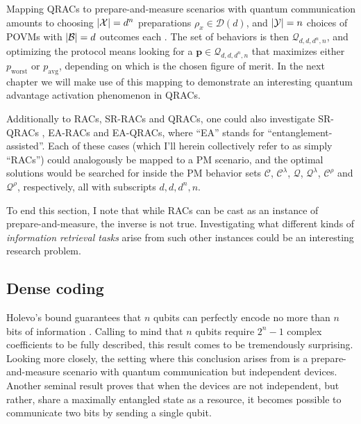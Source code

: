             Mapping QRACs to prepare-and-measure scenarios with quantum communication amounts to choosing $\abs{\mathcal{X}} = d^n$ preparations $\rho_{x} \in \mathcal{D}(d)$, and $\abs{\mathcal{Y}} = n$  choices of POVMs with $\abs{\mathcal{B}} = d$ outcomes each \cite{de_vicente_bound_2019}. The set of behaviors is then $\mathcal{Q}_{d,d,d^n,n}$, and optimizing the protocol means looking for a $\mathbf{p} \in \mathcal{Q}_{d,d,d^n,n}$ that maximizes either $p_{\text{worst}}$ or $p_{\text{avg}}$, depending on which is the chosen figure of merit. In the next chapter we will make use of this mapping to demonstrate an interesting quantum advantage activation phenomenon in QRACs.

            Additionally to RACs, SR-RACs and QRACs, one could also investigate SR-QRACs \cite{ambainis_srqracs_2009}, EA-RACs \cite{pawlowski_earacs_2010} and EA-QRACs, where ``EA'' stands for ``entanglement-assisted''. Each of these cases (which I'll herein collectively refer to as simply ``RACs'') could analogously be mapped to a PM scenario, and the optimal solutions would be searched for inside the PM behavior sets $\mathcal{C}$, $\mathcal{C}^\lambda$, $\mathcal{Q}$, $\mathcal{Q}^\lambda$, $\mathcal{C}^\rho$ and $\mathcal{Q}^\rho$, respectively, all with subscripts $d,d,d^n,n$.

            To end this section, I note that while RACs can be cast as an instance of prepare-and-measure, the inverse is not true. Investigating what different kinds of \emph{information retrieval tasks} \cite{emeriau_torpedo_2020} arise from such other instances could be an interesting research problem.

        \subsection{Dense coding}
        \label{sec:dense-coding}

            Holevo's bound guarantees that $n$ qubits can perfectly encode no more than $n$ bits of information \cite{holevo-bound-1973}. Calling to mind that $n$ qubits require $2^n - 1$ complex coefficients to be fully described, this result comes to be tremendously surprising. Looking more closely, the setting where this conclusion arises from is a prepare-and-measure scenario with quantum communication but independent devices. Another seminal result proves that when the devices are not independent, but rather, share a maximally entangled state as a resource, it becomes possible to communicate two bits by sending a single qubit.

